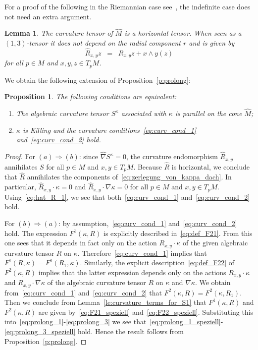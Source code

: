 \documentclass[11pt,a4paper]{article}
\theoremstyle{plain}
\newtheorem{proposition}{Proposition}
\newtheorem{lemma}{Lemma}
\theoremstyle{remark}
\begin{document}
For a proof of the following in the Riemannian case see~\cite[Lemme~1.2]{Ga},
the indefinite case does not need an extra argument.

\bigskip
\begin{lemma}\label{le:krümmungstensor_des_kegels}
  The curvature tensor of $\hat M$ is a horizontal tensor. When seen as a
  $(1,3)$-tensor it does not depend on the radial component $r$ and is given by
\begin{equation}
\label{eq:hat_R_1}
\hat R_{x,y}z\;\;=\;\;R_{x,y}z + x\wedge y (z)
\end{equation}
for all $p\in M$ and $x,y,z\in T_pM$.
\end{lemma}
We obtain the following extension of Proposition~\ref{p:prolong}:


\bigskip
\begin{proposition}\label{p:main}
The following conditions are equivalent:
\begin{enumerate}
\item
The algebraic curvature tensor $S^\kappa$ associated with $\kappa$ is parallel on the cone $\hat M$;
\item $\kappa$ is Killing and the curvature conditions~\eqref{eq:curv_cond_1} and~\eqref{eq:curv_cond_2} hold.
\end{enumerate}
\end{proposition}
\begin{proof}
For $(a) \Rightarrow (b)$: since $\hat \nabla S^\kappa = 0$, the curvature
endomorphism $\hat R_{x,y}$ annihilates $S$ for all $p\in M$ and $x,y\in T_pM$. Because  $\hat R$ is horizontal, we conclude that $\hat R$ annihilates
the components of~\eqref{eq:zerlegung_von_kappa_dach}. In particular, $\hat R_{x,y}\cdot \kappa = 0$ and $\hat R_{x,y} \cdot \nabla\kappa = 0$ for all $p\in M$ and $x,y\in T_pM$. 
Using~\eqref{eq:hat_R_1}, we see that both~\eqref{eq:curv_cond_1} and~\eqref{eq:curv_cond_2} hold.  


For $(b)\Rightarrow (a)$: by assumption,~\eqref{eq:curv_cond_1}
and~\eqref{eq:curv_cond_2} hold. The expression $F^1(\kappa,R)$ is explicitly described in~\eqref{eq:def_F21}. From this one sees that it depends in fact only on the action $R_{x,y}\cdot \kappa$ of
the given algebraic curvature tensor $R$ on $\kappa$. Therefore~\eqref{eq:curv_cond_1} implies that
$F^1(R,\kappa) = F^1(R_1,\kappa)$. Similarly, the explicit
description~\eqref{eq:def_F22} of $F^2(\kappa,R)$ implies that the latter expression depends only on the actions 
$R_{x,y}\cdot\kappa$ and $R_{x,y}\cdot \nabla \kappa$ of the algebraic curvature tensor $R$ on $\kappa$ and $\nabla\kappa$. 
We obtain from~\eqref{eq:curv_cond_1} and~\eqref{eq:curv_cond_2} that $F^2(\kappa,R) = F^2(\kappa,R_1)$. Then we conclude from Lemma~\ref{le:curvature_terms_for_S1} that $F^1(\kappa,R)$ and $F^2(\kappa,R)$ are given by~\eqref{eq:F21_speziell} and~\eqref{eq:F22_speziell}. Substituting this into~\eqref{eq:prolong_1}-\eqref{eq:prolong_3} we see that~\eqref{eq:prolong_1_speziell}-\eqref{eq:prolong_3_speziell} hold. Hence the result follows from Proposition~\ref{p:prolong}.
\end{proof}
\end{document}
